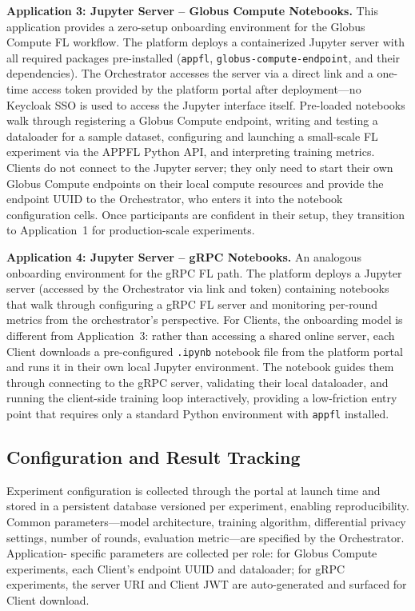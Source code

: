 \documentclass[conference]{IEEEtran}
\begin{document}
\textbf{Application 3: Jupyter Server -- Globus Compute Notebooks.}
This application provides a zero-setup onboarding environment for the
Globus Compute FL workflow. The platform deploys a containerized
Jupyter server with all required packages pre-installed (\texttt{appfl},
\texttt{globus-compute-endpoint}, and their dependencies). The
Orchestrator accesses the server via a direct link and a one-time
access token provided by the platform portal after deployment---no
Keycloak SSO is used to access the Jupyter interface itself. Pre-loaded
notebooks walk through registering a Globus Compute endpoint, writing
and testing a dataloader for a sample dataset, configuring and
launching a small-scale FL experiment via the APPFL Python API, and
interpreting training metrics. Clients do not connect to the Jupyter
server; they only need to start their own Globus Compute endpoints on
their local compute resources and provide the endpoint UUID to the
Orchestrator, who enters it into the notebook configuration cells.
Once participants are confident in their setup, they transition to
Application~1 for production-scale experiments.

\textbf{Application 4: Jupyter Server -- gRPC Notebooks.} An
analogous onboarding environment for the gRPC FL path. The platform
deploys a Jupyter server (accessed by the Orchestrator via link and
token) containing notebooks that walk through configuring a gRPC FL
server and monitoring per-round metrics from the orchestrator's
perspective. For Clients, the onboarding model is different from
Application~3: rather than accessing a shared online server, each
Client downloads a pre-configured \texttt{.ipynb} notebook file from
the platform portal and runs it in their own local Jupyter environment.
The notebook guides them through connecting to the gRPC server,
validating their local dataloader, and running the client-side training
loop interactively, providing a low-friction entry point that requires
only a standard Python environment with \texttt{appfl} installed.

\subsection{Configuration and Result Tracking}

Experiment configuration is collected through the portal at launch
time and stored in a persistent database versioned per experiment,
enabling reproducibility. Common parameters---model architecture,
training algorithm, differential privacy settings, number of rounds,
evaluation metric---are specified by the Orchestrator. Application-
specific parameters are collected per role: for Globus Compute
experiments, each Client's endpoint UUID and dataloader; for gRPC
experiments, the server URI and Client JWT are auto-generated and
surfaced for Client download.
\end{document}
